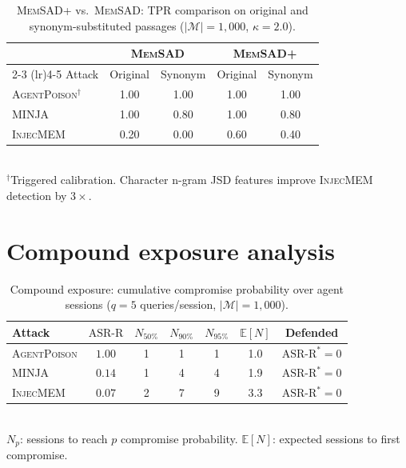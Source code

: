 \documentclass{article}
\theoremstyle{definition}
\newcommand{\asrr}{\text{ASR-R}}
\newcommand{\EE}{\mathbb{E}}
\newcommand{\cM}{\mathcal{M}}
\newcommand{\memsad}{\textnormal{\textsc{MemSAD}}}
\newcommand{\agentpoison}{\textsc{AgentPoison}}
\newcommand{\minja}{\textsc{MINJA}}
\newcommand{\injecmem}{\textsc{InjecMEM}}
\begin{document}
\begin{table}[ht]
  \centering
  \small
  \caption{\memsad{}+ vs.\ \memsad{}: TPR comparison on original and synonym-substituted passages ($|\cM| = 1{,}000$, $\kappa = 2.0$).}
  \label{tab:memsad_plus}
  \vspace{2pt}
  \begin{tabular}{l cc cc}
    \toprule
    & \multicolumn{2}{c}{\memsad{}} & \multicolumn{2}{c}{\memsad{}+} \\
    \cmidrule(lr){2-3} \cmidrule(lr){4-5}
    Attack & Original & Synonym & Original & Synonym \\
    \midrule
    \agentpoison{}$^\dagger$ & 1.00 & 1.00 & 1.00 & 1.00 \\
    \minja{}                  & 1.00 & 0.80 & 1.00 & 0.80 \\
    \injecmem{}               & 0.20 & 0.00 & 0.60 & 0.40 \\
    \bottomrule
  \end{tabular}
  \\[2pt]
  {\footnotesize $^\dagger$Triggered calibration. Character n-gram JSD features improve \injecmem{} detection by $3\times$.}
\end{table}

\section{Compound exposure analysis}
\label{app:compound}

\begin{table}[ht]
  \centering
  \small
  \caption{Compound exposure: cumulative compromise probability over agent sessions ($q = 5$ queries/session, $|\cM| = 1{,}000$).}
  \label{tab:compound_exposure}
  \vspace{2pt}
  \begin{tabular}{l c cccc c}
    \toprule
    Attack & $\asrr$ & $N_{50\%}$ & $N_{90\%}$ & $N_{95\%}$ & $\EE[N]$ & Defended \\
    \midrule
    \agentpoison{} & $1.00$ & 1 & 1 & 1 & 1.0 & $\asrr^* = 0$ \\
    \minja{}        & $0.14$ & 1 & 4 & 4 & 1.9 & $\asrr^* = 0$ \\
    \injecmem{}     & $0.07$ & 2 & 7 & 9 & 3.3 & $\asrr^* = 0$ \\
    \bottomrule
  \end{tabular}
  \\[2pt]
  {\footnotesize $N_p$: sessions to reach $p$ compromise probability. $\EE[N]$: expected sessions to first compromise.}
\end{table}
\end{document}
